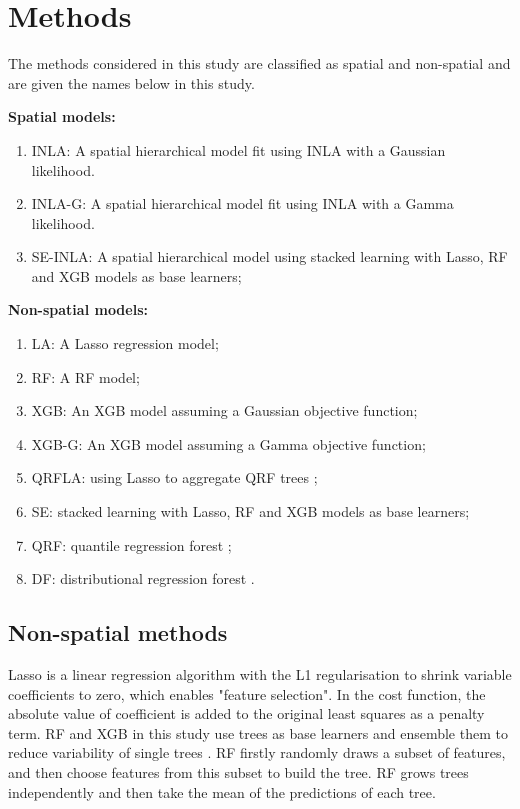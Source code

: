 \documentclass{article}
\begin{document}
\section {Methods}

The methods considered in this study are classified as spatial and non-spatial and are given the names below in this study.

\noindent\textbf{Spatial models:}
\begin{enumerate}
\item INLA: A spatial hierarchical model fit using INLA with a Gaussian likelihood.  
\item INLA-G: A spatial hierarchical model fit using INLA with a Gamma likelihood. 
\item SE-INLA: A spatial hierarchical model using stacked learning with Lasso, RF and XGB models as base learners;
\end{enumerate}

\noindent\textbf{Non-spatial models:}
\begin{enumerate}
\item LA: A Lasso regression model; 
\item RF: A RF model; 
\item XGB: An XGB model assuming a Gaussian objective function; 
\item XGB-G: An XGB model assuming a Gamma objective function; 
\item QRFLA: using Lasso to aggregate QRF trees \citep{hastie2009elements};
\item SE: stacked learning with Lasso, RF and XGB models as base learners; 
\item QRF: quantile regression forest \citep{meinshausen2006quantile};
\item DF: distributional regression forest \citep{schlosser2019distributional}.
\end{enumerate}



\noindent\subsection{Non-spatial methods}
Lasso is a linear regression algorithm with the L1 regularisation to shrink variable coefficients to zero, which enables "feature selection". In the cost function, the absolute value of coefficient is added to the original least squares as a penalty term. RF and XGB in this study use trees as base learners and ensemble them to reduce variability of single trees \citep{friedman2001greedy}. RF firstly randomly draws a subset of features, and then choose features from this subset to build the tree. RF \citep{breiman2001random} grows trees independently and then take the mean of the predictions of each tree. 
\end{document}

